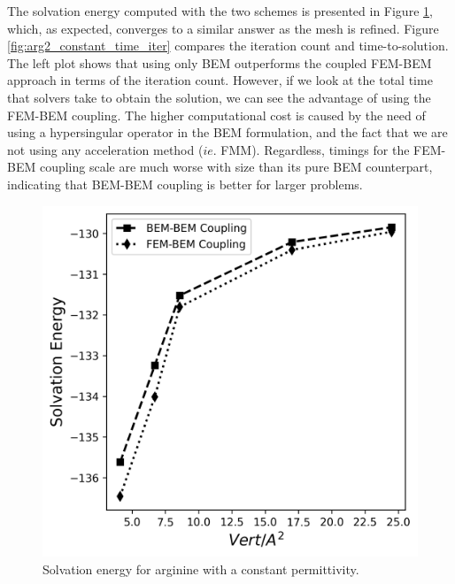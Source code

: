 The solvation energy computed with the two schemes is presented in Figure \ref{fig:arg_constant_energy}, which, as expected, converges to a similar answer as the mesh is refined.
Figure \ref{fig:arg2_constant_time_iter} compares the iteration count and time-to-solution. The left plot shows that using only BEM outperforms the coupled FEM-BEM approach in terms of the iteration count. However, if we look at the total time that solvers take to obtain the solution, we can see the advantage of using the FEM-BEM coupling. The higher computational cost is caused by the need of using a hypersingular operator in the BEM formulation, and the fact that we are not using any acceleration method ($ie.$ FMM). Regardless, timings for the FEM-BEM coupling scale are much worse with size than its pure BEM counterpart, indicating that BEM-BEM coupling is better for larger problems. 


\begin{figure}
\centering
   \includegraphics[width=0.45\linewidth]{DolfinX_Arginine2_const_coeff_error.png}
\caption{Solvation energy for arginine with a constant permittivity.}
\label{fig:arg_constant_energy}
\end{figure}

